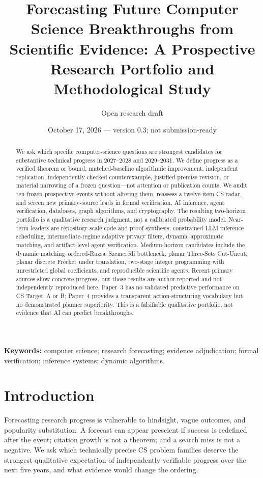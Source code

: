 \documentclass[11pt]{article}
\title{Forecasting Future Computer Science Breakthroughs from Scientific Evidence: A Prospective Research Portfolio and Methodological Study}
\author{Open research draft}
\date{October 17, 2026 --- version 0.3; not submission-ready}
\begin{document}
\maketitle

\begin{abstract}
We ask which specific computer-science questions are strongest candidates for substantive technical progress in 2027--2028 and 2029--2031. We define progress as a verified theorem or bound, matched-baseline algorithmic improvement, independent replication, independently checked counterexample, justified premise revision, or material narrowing of a frozen question---not attention or publication counts. We audit ten frozen prospective events without altering them, reassess a twelve-item CS radar, and screen new primary-source leads in formal verification, AI inference, agent verification, databases, graph algorithms, and cryptography. The resulting two-horizon portfolio is a qualitative research judgment, not a calibrated probability model. Near-term leaders are repository-scale code-and-proof synthesis, constrained LLM inference scheduling, intermediate-regime adaptive privacy filters, dynamic approximate matching, and artifact-level agent verification. Medium-horizon candidates include the dynamic matching--ordered-Ruzsa--Szemer\'edi bottleneck, planar Three-Sets Cut-Uncut, planar discrete Fr\'echet under translation, two-stage integer programming with unrestricted global coefficients, and reproducible scientific agents. Recent primary sources show concrete progress, but those results are author-reported and not independently reproduced here. Paper~3 has no validated predictive performance on CS Target~A or B; Paper~4 provides a transparent action-structuring vocabulary but no demonstrated planner superiority. This is a falsifiable qualitative portfolio, not evidence that AI can predict breakthroughs.
\end{abstract}

\noindent\textbf{Keywords:} computer science; research forecasting; evidence adjudication; formal verification; inference systems; dynamic algorithms.

\section{Introduction}
Forecasting research progress is vulnerable to hindsight, vague outcomes, and popularity substitution. A forecast can appear prescient if success is redefined after the event; citation growth is not a theorem; and a search miss is not a negative. We ask which technically precise CS problem families deserve the strongest qualitative expectation of independently verifiable progress over the next five years, and what evidence would change the ordering.
\end{document}
